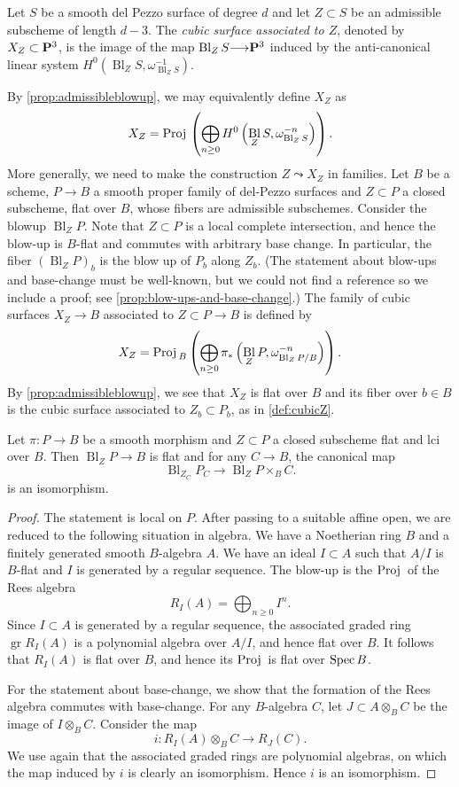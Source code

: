 \documentclass[12pt,reqno]{amsart}
\DeclareMathOperator{\Bl}{Bl}
\renewcommand{\to}{{\longrightarrow}}
\numberwithin{equation}{section}
\newcommand{\Proj}{{\text{\rm Proj}\,}}
\begin{document}
\begin{definition}
  \label{def:cubicZ}
  Let $S$ be a smooth del Pezzo surface of degree $d$ and let $Z \subset S$ be an admissible subscheme of length $d-3$.
  The \emph{cubic surface associated to $Z$}, denoted by
  $X_Z \subset \P^3$, is the image of the map
  $\Bl_{Z}S \to \P^3$ induced by the anti-canonical linear system $H^0\left(\Bl_ZS, \omega_{\Bl_Z S}^{-1}\right)$.
\end{definition}
By \autoref{prop:admissibleblowup}, we may equivalently define $X_Z$ as
\[ X_Z = \Proj \left( \bigoplus_{n \geq 0} H^0\left( \Bl_ZS, \omega_{\Bl_Z S}^{-n} \right) \right).\]
More generally, we need to make the construction $Z \leadsto X_Z$ in families.
Let $B$ be a scheme, $P \to B$ a smooth proper family of del-Pezzo surfaces and $Z \subset  P$ a closed subscheme, flat over $B$, whose fibers are admissible subschemes.
Consider the blowup $\Bl_{ Z}  P$.
Note that $Z \subset  P$ is a local complete intersection, and hence the blow-up is $B$-flat and commutes with arbitrary base change.
In particular, the fiber $(\Bl_ZP)_b$ is the blow up of $P_b$ along $Z_b$.
(The statement about blow-ups and base-change must be well-known, but we could not find a reference so we include a proof; see \autoref{prop:blow-ups-and-base-change}.)
The family of cubic surfaces $X_Z \to B$ associated to $Z \subset P \to B$ is defined by
\[
  X_Z = \Proj_B \left(\bigoplus_{n \geq 0}\pi_*\left(\Bl_ZP, \omega_{\Bl_ZP/B}^{-n}\right)\right).
\]
By \autoref{prop:admissibleblowup}, we see that $X_Z$ is flat over $B$
and its fiber over $b \in B$ is the cubic surface associated to
$Z_b \subset P_b$, as in \autoref{def:cubicZ}.
\begin{proposition}\label{prop:blow-ups-and-base-change}
  Let $\pi \colon P \to B$ be a smooth morphism and $Z \subset P$ a closed subscheme flat and lci over $B$.
  Then $\Bl_ZP \to B$ is flat and for any $C \to B$, the canonical map
  \[  \Bl_{Z_C} P_C \to \Bl_ZP \times_B C.\]
  is an isomorphism.
\end{proposition}
\begin{proof}
  The statement is local on $P$.
  After passing to a suitable affine open, we are reduced to the following situation in algebra.
  We have a Noetherian ring $B$ and a finitely generated smooth $B$-algebra $A$.
  We have an ideal $I \subset A$ such that $A/I$ is $B$-flat and $I$ is generated by a regular sequence.
  The blow-up is the $\Proj$ of the Rees algebra
  \[R_I(A) = \bigoplus_{n \geq 0}I^n.\]
  Since $I \subset A$ is generated by a regular sequence, the associated graded ring $\operatorname{gr} R_I(A)$ is a polynomial algebra over $A/I$, and hence flat over $B$.
  It follows that $R_I(A)$ is flat over $B$, and hence its $\Proj$ is flat over $\spec B$.
  
  For the statement about base-change, we show that the formation of the Rees algebra commutes with base-change.
  For any $B$-algebra $C$, let $J \subset A \otimes_B C$ be the image of $I \otimes_B C$.
  Consider the map
  \[ i \colon R_I(A) \otimes_B C \to R_J(C).\]
  We use again that the associated graded rings are polynomial algebras, on which the map induced by $i$ is clearly an isomorphism.
  Hence $i$ is an isomorphism.
\end{proof}
\end{document}
